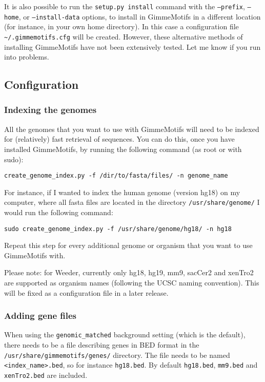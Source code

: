 \documentclass[10pt]{article}
\begin{document}
It is also possible to run the \texttt{setup.py install} command with the \texttt{--prefix}, \texttt{--home}, or \texttt{--install-data} options, to install in GimmeMotifs in a different location (for instance, in your own home directory). In this case a configuration file \texttt{\textasciitilde{}/.gimmemotifs.cfg} will be created. However, these alternative methods of installing GimmeMotifs have not been extensively tested. Let me know if you run into problems.

\subsection{Configuration}

\subsubsection{Indexing the genomes}
\label{sec:indexing}
All the genomes that you want to use with GimmeMotifs will need to be indexed for (relatively) fast retrieval of sequences. You can do this, once you have installed GimmeMotifs, by running the following command (as root or with sudo):
\begin{verbatim}
create_genome_index.py -f /dir/to/fasta/files/ -n genome_name
\end{verbatim}
For instance, if I wanted to index the human genome (version hg18) on my computer, where all fasta files are located in the directory \texttt{/usr/share/genome/} I would run the following command:
\begin{verbatim}
sudo create_genome_index.py -f /usr/share/genome/hg18/ -n hg18
\end{verbatim}
Repeat this step for every additional genome or organism that you want to use GimmeMotifs with.

Please note: for Weeder, currently only hg18, hg19, mm9, sacCer2 and xenTro2 are supported as organism names (following the UCSC naming convention). This will be fixed as a configuration file in a later release.

\subsubsection{Adding gene files}
When using the \texttt{genomic\_matched} background setting (which is the default), there needs to be a file describing genes in BED format in the \texttt{/usr/share/gimmemotifs/genes/} directory. The file needs to be named \texttt{<index\_name>.bed}, so for instance \texttt{hg18.bed}. By default \texttt{hg18.bed}, \texttt{mm9.bed} and \texttt{xenTro2.bed} are included.
\end{document}
